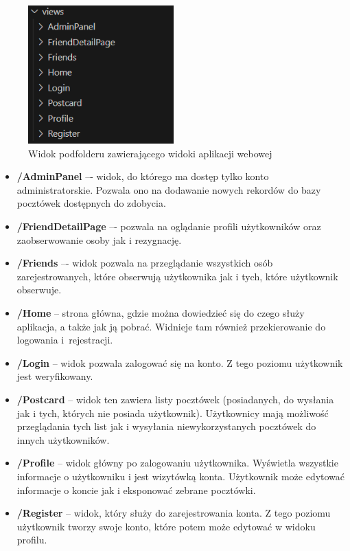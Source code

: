 \documentclass[a4paper,twoside,12pt]{book}
\begin{document}
\begin{itemize}
\begin{figure}[H]
            \includegraphics[width=0.5\textwidth]{webowka_ss/widoki.png}
            \caption{Widok podfolderu zawierającego widoki aplikacji webowej}
        \end{figure}
        \begin{itemize}
            \item \textbf{/AdminPanel} –- widok, do którego ma dostęp tylko konto administratorskie. Pozwala ono na dodawanie nowych rekordów do bazy pocztówek dostępnych do zdobycia.
            \item \textbf{/FriendDetailPage} –- pozwala na oglądanie profili użytkowników oraz zaobserwowanie osoby jak i rezygnację.
            \item \textbf{/Friends} –- widok pozwala na przeglądanie wszystkich osób zarejestrowanych, które obserwują użytkownika jak i tych, które użytkownik obserwuje.
            \item \textbf{/Home} -- strona główna, gdzie można dowiedzieć się do czego służy aplikacja, a także jak ją pobrać. Widnieje tam również przekierowanie do logowania i~rejestracji.
            \item \textbf{/Login} -- widok pozwala zalogować się na konto. Z tego poziomu użytkownik jest weryfikowany.
            \item \textbf{/Postcard} -- widok ten zawiera listy pocztówek (posiadanych, do wysłania jak i tych, których nie posiada użytkownik). Użytkownicy mają możliwość przeglądania tych list jak i wysyłania niewykorzystanych pocztówek do innych użytkowników.
            \item \textbf{/Profile} -- widok główny po zalogowaniu użytkownika. Wyświetla wszystkie informacje o użytkowniku i jest wizytówką konta. Użytkownik może edytować informacje o koncie jak i eksponować zebrane pocztówki.
            \item \textbf{/Register} -- widok, który służy do zarejestrowania konta. Z tego poziomu użytkownik tworzy swoje konto, które potem może edytować w widoku profilu.
        \end{itemize}
\end{itemize}
\end{document}
